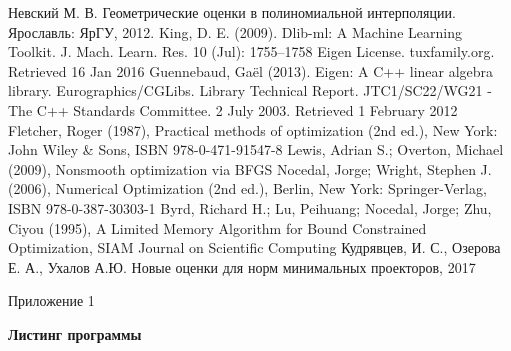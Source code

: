 \documentclass[12pt, a4paper]{extarticle}
\begin{document}
\newpage
\begin{thebibliography}{1}
Невский М. В. Геометрические оценки в полиномиальной интерполяции. Ярославль: ЯрГУ, 2012.
King, D. E. (2009). Dlib-ml: A Machine Learning Toolkit. J. Mach. Learn. Res. 10 (Jul): 1755–1758
Eigen License. tuxfamily.org. Retrieved 16 Jan 2016
Guennebaud, Gaël (2013). Eigen: A C++ linear algebra library. Eurographics/CGLibs.
Library Technical Report. JTC1/SC22/WG21 - The C++ Standards Committee. 2 July 2003. Retrieved 1 February 2012
Fletcher, Roger (1987), Practical methods of optimization (2nd ed.), New York: John Wiley \& Sons, ISBN 978-0-471-91547-8
Lewis, Adrian S.; Overton, Michael (2009), Nonsmooth optimization via BFGS
Nocedal, Jorge; Wright, Stephen J. (2006), Numerical Optimization (2nd ed.), Berlin, New York: Springer-Verlag, ISBN 978-0-387-30303-1
Byrd, Richard H.; Lu, Peihuang; Nocedal, Jorge; Zhu, Ciyou (1995), A Limited Memory Algorithm for Bound Constrained Optimization, SIAM Journal on Scientific Computing
	Кудрявцев, И. С., Озерова Е. А., Ухалов А.Ю. Новые оценки для норм минимальных проекторов, 2017


\end{thebibliography}
\newpage
\begin{flushright}
Приложение 1
\end{flushright}
\begin{center}
	{\bf Листинг программы }
\end{center}
\end{document}

